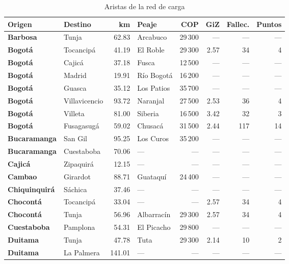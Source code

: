 \renewcommand{\arraystretch}{1.2}
\begin{longtable}{|l|l|r|l|r|r|r|r|}
\caption{Aristas de la red de carga}\label{tab:aristas}\\
\hline
\rowcolor{gray!20} \textbf{Origen} & \textbf{Destino} & \textbf{km} & \textbf{Peaje} & \textbf{COP} & \textbf{GiZ} & \textbf{Fallec.} & \textbf{Puntos} \\
\hline
\endhead
\textbf{Barbosa} & Tunja & 62.83 & Arcabuco & 29\,300 & --- & --- & --- \\
\hline
\textbf{Bogotá} & Tocancipá & 41.19 & El Roble & 29\,300 & 2.57 & 34 & 4 \\
\hline
\textbf{Bogotá} & Cajicá & 37.18 & Fusca & 12\,500 & --- & --- & --- \\
\hline
\textbf{Bogotá} & Madrid & 19.91 & Río Bogotá & 16\,200 & --- & --- & --- \\
\hline
\textbf{Bogotá} & Guasca & 35.12 & Los Patios & 35\,700 & --- & --- & --- \\
\hline
\textbf{Bogotá} & Villavicencio & 93.72 & Naranjal & 27\,500 & 2.53 & 36 & 4 \\
\hline
\textbf{Bogotá} & Villeta & 81.00 & Siberia & 16\,500 & 3.42 & 32 & 3 \\
\hline
\textbf{Bogotá} & Fusagasugá & 59.02 & Chusacá & 31\,500 & 2.44 & 117 & 14 \\
\hline
\textbf{Bucaramanga} & San Gil & 95.25 & Los Curos & 35\,200 & --- & --- & --- \\
\hline
\textbf{Bucaramanga} & Cuestaboba & 70.06 & --- & --- & --- & --- & --- \\
\hline
\textbf{Cajicá} & Zipaquirá & 12.15 & --- & --- & --- & --- & --- \\
\hline
\textbf{Cambao} & Girardot & 88.71 & Guataquí & 24\,400 & --- & --- & --- \\
\hline
\textbf{Chiquinquirá} & Sáchica & 37.46 & --- & --- & --- & --- & --- \\
\hline
\textbf{Chocontá} & Tocancipá & 33.04 & --- & --- & 2.57 & 34 & 4 \\
\hline
\textbf{Chocontá} & Tunja & 56.96 & Albarracín & 29\,300 & 2.57 & 34 & 4 \\
\hline
\textbf{Cuestaboba} & Pamplona & 54.31 & El Picacho & 29\,800 & --- & --- & --- \\
\hline
\textbf{Duitama} & Tunja & 47.78 & Tuta & 29\,300 & 2.14 & 10 & 2 \\
\hline
\textbf{Duitama} & La Palmera & 141.01 & --- & --- & --- & --- & --- \\

\end{longtable}
